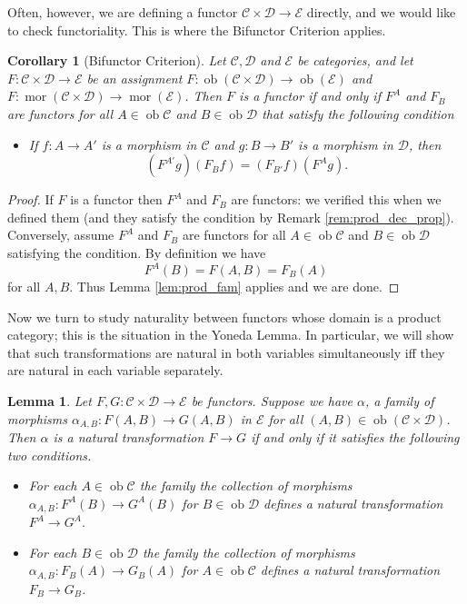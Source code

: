 \documentclass{report}
\DeclareMathOperator{\ob}{ob}
\DeclareMathOperator{\mor}{mor}
\theoremstyle{definition}
\theoremstyle{plain}
\newtheorem{lem}[thm]{Lemma}
\newtheorem{coro}[thm]{Corollary}
\theoremstyle{definition}
\begin{document}
		Often, however, we are defining a functor $\mathcal{C}\times\mathcal{D}\to \mathcal{E}$ directly, and we would like to check functoriality. This is where the Bifunctor Criterion applies.
		\begin{coro}[Bifunctor Criterion]
			Let $\mathcal{C},\mathcal{D}$ and $\mathcal{E}$ be categories, and let $F\colon\mathcal{C}\times\mathcal{D}\to \mathcal{E}$ be an assignment $F\colon \ob(\mathcal{C}\times\mathcal{D})\to \ob(\mathcal{E})$ and $F\colon \mor(\mathcal{C}\times\mathcal{D})\to \mor(\mathcal{E})$. Then $F$ is a functor if and only if $F^A$ and $F_B$ are functors for all $A\in\ob\mathcal{C}$ and $B\in\ob\mathcal{D}$ that satisfy the following condition
			\begin{itemize}
				\item If $f\colon A \to A'$ is a morphism in $\mathcal{C}$ and $g\colon B\to B'$ is a morphism in $\mathcal{D}$, then 
				\[
				(F^{A'}g)(F_Bf) = (F_{B'}f)(F^Ag).
				\]
			\end{itemize}
		\end{coro}
		\begin{proof}
			If $F$ is a functor then $F^A$ and $F_B$ are functors: we verified this when we defined them (and they satisfy the condition by Remark \ref{rem:prod_dec_prop}). Conversely, assume $F^A$ and $F_B$ are functors for all $A\in\ob\mathcal{C}$ and $B\in\ob\mathcal{D}$ satisfying the condition. By definition we have
			\[
				F^A(B) = F(A,B) = F_B(A)
			\]
			for all $A,B$. Thus Lemma \ref{lem:prod_fam} applies and we are done.			
		\end{proof}
		Now we turn to study naturality between functors whose domain is a product category; this is the situation in the Yoneda Lemma. In particular, we will show that such transformations are natural in both variables simultaneously iff they are natural in each variable separately. 
		\begin{lem}
			Let $F,G\colon\mathcal{C}\times\mathcal{D}\to\mathcal{E}$ be functors. Suppose we have $\alpha$, a family of morphisms $\alpha_{A,B}\colon F(A,B)\to G(A,B)$ in $\mathcal{E}$ for all $(A,B)\in\ob(\mathcal{C}\times\mathcal{D})$. Then $\alpha$ is a natural transformation $F \to G$ if and only if it satisfies the following two conditions.
			\begin{itemize}
				\item For each $A\in\ob\mathcal{C}$ the family the collection of morphisms $\alpha_{A,B}\colon F^A(B) \to G^A(B)$ for $B\in\ob\mathcal{D}$ defines a natural transformation $F^A \to G^A$.
				\item For each $B\in\ob\mathcal{D}$ the family the collection of morphisms $\alpha_{A,B}\colon F_B(A) \to G_B(A)$ for $A\in\ob\mathcal{C}$ defines a natural transformation $F_B \to G_B$.
			\end{itemize}
		\end{lem}
\end{document}
